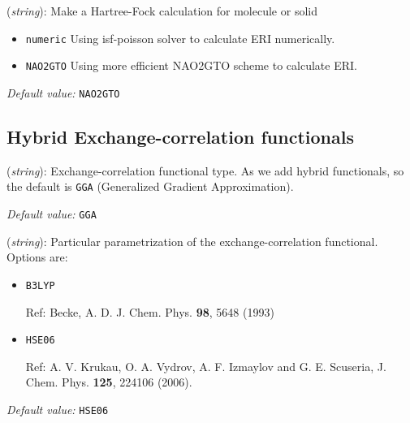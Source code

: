 \documentclass[11pt]{article}
\begin{document}
\begin{description}
\itemsep 10pt
\parsep 0pt

\item[{\bf HF}] ({\it string}): 
Make a Hartree-Fock calculation for molecule or solid

\begin{itemize} 
\item {\tt numeric}  
Using isf-poisson solver to calculate ERI numerically. 

\item {\tt NAO2GTO}
Using more efficient NAO2GTO scheme to calculate ERI.
\end{itemize}
{\it Default value:} {\tt NAO2GTO}

\end{description}




\vspace{5pt}
\subsection{Hybrid Exchange-correlation functionals}

\begin{description}
\itemsep 10pt
\parsep 0pt

\item[{\bf XC.functional}] ({\it string}):
Exchange-correlation functional type.  As we add hybrid
functionals, so the default is 
{\tt GGA} (Generalized Gradient Approximation).


{\it Default value:} {\tt GGA}


\item[{\bf XC.authors}] ({\it string}):
Particular parametrization of the
exchange-correlation functional. Options are:
\begin{itemize}


\item {\tt B3LYP}   

Ref: Becke, A. D. J. Chem. Phys. {\bf 98}, 5648 (1993)


\item {\tt HSE06}   

Ref: A. V. Krukau, O. A. Vydrov, A. F. Izmaylov and G. E. Scuseria,
J. Chem. Phys. {\bf 125}, 224106 (2006).


\end{itemize}

{\it Default value:} {\tt HSE06}



\end{description}
\end{document}
